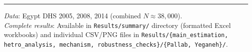 \documentclass[12pt,a4paper]{article}
\begin{document}
\vspace{12pt}
\noindent\rule{\textwidth}{0.5pt}
\vspace{4pt}
\noindent \textit{Data}: Egypt DHS 2005, 2008, 2014 (combined $N \approx 38{,}000$). \\
\noindent \textit{Complete results}: Available in \texttt{Results/summary/} directory (formatted Excel workbooks) and individual CSV/PNG files in \texttt{Results/\{main\_estimation, hetro\_analysis, mechanism, robustness\_checks\}/\{Pallab, Yeganeh\}/}.
\end{document}
